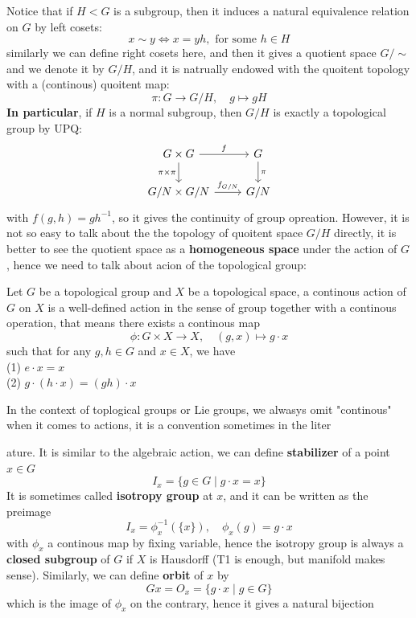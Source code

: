 Notice that if \(H < G\) is a subgroup, then it induces a natural equivalence relation on \(G\) by left cosets:
\[x \sim y \iff x=yh, \text{ for some } h \in H\]
similarly we can define right cosets here, and then it gives a quotient space \(G/\sim\) and we denote it by \(G/H\), and it is natrually endowed with the quoitent topology with a (continous) quoitent map:
\[\pi: G \to G/H, \quad g \mapsto gH\]
\textbf{In particular}, if \(H\) is a normal subgroup, then \(G/H\) is exactly a topological group by UPQ:
\[
\begin{tikzcd}
G \times G \arrow[r, "f"] \arrow[d, "\pi \times \pi"'] 
& G \arrow[d, "\pi"] \\
G/N \times G/N \arrow[r, "f_{G/N}"] 
& G/N
\end{tikzcd}
\]
with \(f(g,h) = gh^{-1}\), so it gives the continuity of group opreation. However, it is not so easy to talk about the the topology of quoitent space \(G/H\) directly, it is better to see the quotient space as a \textbf{homogeneous space} under the action of \(G\), hence we need to talk about acion of the topological group:

\begin{definition}
    Let \(G\) be a topological group and \(X\) be a topological space, a continous action of \(G\) on \(X\) is a well-defined action in the sense of group together with a continous operation, that means there exists a continous map
    \[\phi: G \times X \to X, \quad (g,x) \mapsto g \cdot x\]
    such that for any \(g,h \in G\) and \(x \in X\), we have\\

    (1) \(e \cdot x = x\)\\

    (2) \(g \cdot (h \cdot x) = (gh) \cdot x\)
\end{definition}

In the context of toplogical groups or Lie groups, we alwasys omit "continous" when it comes to actions, it is a convention sometimes in the liter

ature. It is similar to the algebraic action, we can define \textbf{stabilizer} of a point \(x \in G\)
\[I_x = \{g \in G \mid g \cdot x = x \}\]
It is sometimes called \textbf{isotropy group} at \(x\), and it can be written as the preimage
\[I_x = \phi_x^{-1}(\{x\}), \quad \phi_x(g) = g \cdot x\]
with \(\phi_x\) a continous map by fixing variable, hence the isotropy group is always a \textbf{closed subgroup} of \(G\) if \(X\) is Hausdorff (T1 is enough, but manifold makes sense). Similarly, we can define \textbf{orbit} of \(x\) by
\[Gx = O_x = \{g \cdot x \mid g \in G\} \]
which is the image of \(\phi_x\) on the contrary, hence it gives a natural bijection

